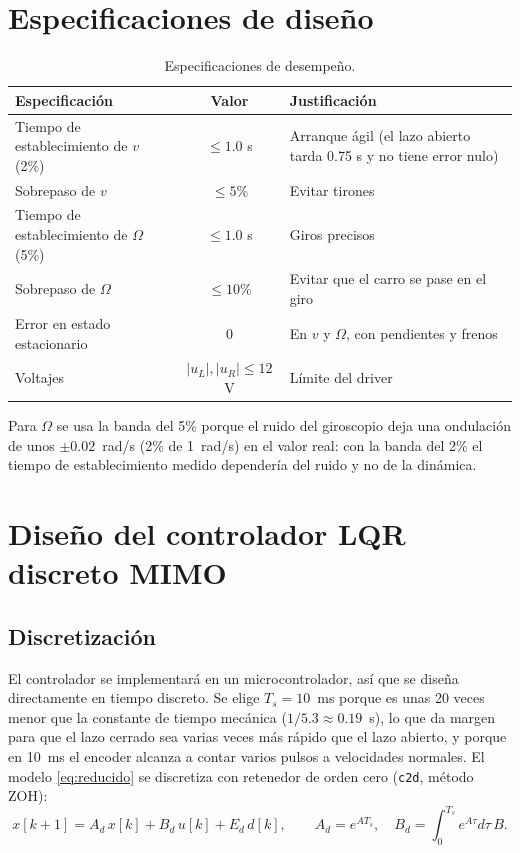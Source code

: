 \documentclass[11pt,letterpaper]{article}
\begin{document}
\section{Especificaciones de diseño}
\begin{table}[H]
\centering
\caption{Especificaciones de desempeño.}
\label{tab:especificaciones}
\begin{tabular}{p{5.6cm} c p{6.4cm}}
\toprule
Especificación & Valor & Justificación \\
\midrule
Tiempo de establecimiento de $v$ (2\%) & $\le 1.0$ s & Arranque ágil (el lazo abierto tarda 0.75 s y no tiene error nulo) \\
Sobrepaso de $v$ & $\le 5$\% & Evitar tirones \\
Tiempo de establecimiento de $\Omega$ (5\%) & $\le 1.0$ s & Giros precisos \\
Sobrepaso de $\Omega$ & $\le 10$\% & Evitar que el carro se pase en el giro \\
Error en estado estacionario & 0 & En $v$ y $\Omega$, con pendientes y frenos \\
Voltajes & $|u_L|,|u_R| \le 12$ V & Límite del driver \\
\bottomrule
\end{tabular}
\end{table}
Para $\Omega$ se usa la banda del 5\% porque el ruido del giroscopio deja una ondulación de unos $\pm0.02$~rad/s (2\% de 1~rad/s) en el valor real: con la banda del 2\% el tiempo de establecimiento medido dependería del ruido y no de la dinámica.

\section{Diseño del controlador LQR discreto MIMO}
\subsection{Discretización}
El controlador se implementará en un microcontrolador, así que se diseña directamente en tiempo discreto. Se elige $T_s = 10$~ms porque es unas 20 veces menor que la constante de tiempo mecánica ($1/5.3 \approx 0.19$~s), lo que da margen para que el lazo cerrado sea varias veces más rápido que el lazo abierto, y porque en 10~ms el encoder alcanza a contar varios pulsos a velocidades normales. El modelo \eqref{eq:reducido} se discretiza con retenedor de orden cero (\texttt{c2d}, método ZOH):
\begin{equation}
  x[k+1] = A_d\, x[k] + B_d\, u[k] + E_d\, d[k],\qquad A_d = e^{AT_s},\quad B_d = \int_0^{T_s} e^{A\tau}d\tau\, B .
\end{equation}
\end{document}
